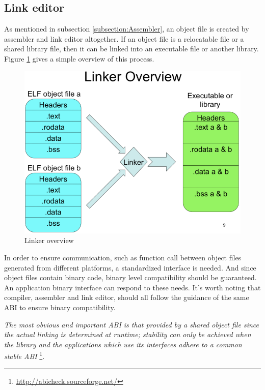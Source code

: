     \subsection{Link editor}\label{Link editor}        As mentioned in subsection \ref{subsection:Assembler}, an object file is created by assembler and link editor altogether. If an object file is a relocatable file or a shared library file, then it can be linked into an executable file or another library. Figure \ref{fig:Linker} gives a simple overview of this process.         
     \begin{figure}
        \centering
        \includegraphics[scale = 0.3]
        {Images/concepts/Linker.png}
        \caption[Linker overview]%
        {Linker overview\footnotemark}    
        \label{fig:Linker}
    \end{figure}
        
        In order to ensure communication, such as function call between object files generated from different platforms, a standardized interface is needed. And since object files contain binary code, binary level compatibility should be guaranteed. An application binary interface can respond to these needs. It's worth noting that compiler, assembler and link editor, should all follow the guidance of the same ABI to ensure binary compatibility.
        
           \textit{The most obvious and important ABI is that provided by a shared object file since the actual linking is determined at runtime; stability can only be achieved when the library and the applications which use its interfaces adhere to a common stable ABI} \footnote{\url{http://abicheck.sourceforge.net/}}.
        
